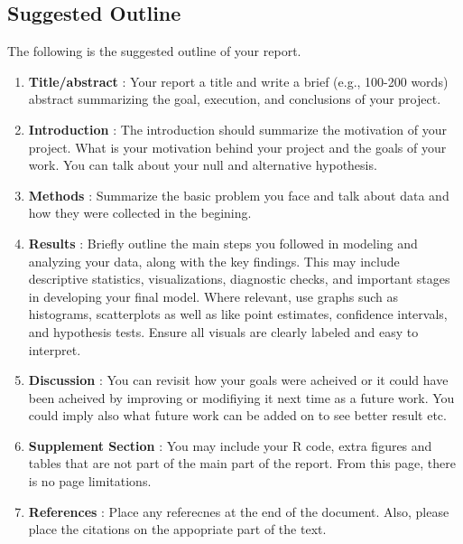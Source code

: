 \documentclass[12pt]{article}
\begin{document}
\subsection*{Suggested Outline}
The following is the suggested outline of your report. 
\begin{enumerate}
    \item \textbf{Title/abstract} : Your report a title and write a brief (e.g., 100-200 words)
    abstract summarizing the goal, execution, and conclusions of your project.  
    \item \textbf{Introduction} : The introduction should summarize the motivation of your project. What is your motivation behind your project and the goals of your work. You can talk about your null and alternative hypothesis. 
    \item \textbf{Methods} : Summarize the basic problem you face and talk about data and how they were collected in the begining. 
    \item \textbf{Results} : Briefly outline the main steps you followed in modeling and analyzing your data, along with the key findings. This may include descriptive statistics, visualizations, diagnostic checks, and important stages in developing your final model. Where relevant, use graphs such as histograms, scatterplots as well as like point estimates, confidence intervals, and hypothesis tests. Ensure all visuals are clearly labeled and easy to interpret. 
    \item \textbf{Discussion} : You can revisit how your goals were acheived or it could have been acheived by improving or modifiying it next time as a future work. You could imply also what future work can be added on to see better result etc. 
    \item \textbf{Supplement Section }: You may include your R code, extra figures and tables that are not part of the main part of the report. From this page, there is no page limitations. 
    \item \textbf{References }: Place any referecnes at the end of the document. Also, please place the citations on the appopriate part of the text. 
\end{enumerate}
    

\end{document}
